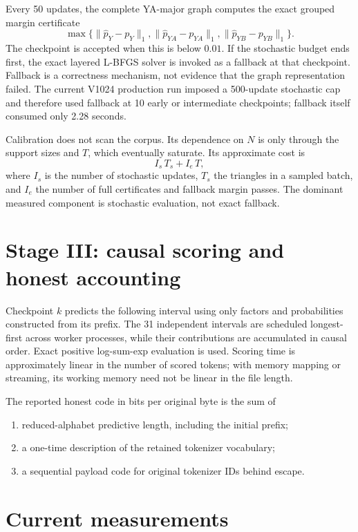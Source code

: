 \documentclass[11pt]{article}
\begin{document}
Every 50 updates, the complete YA-major graph computes the exact grouped
margin certificate
\[
 \max\{\|\widehat p_Y-p_Y\|_1,
        \|\widehat p_{YA}-p_{YA}\|_1,
        \|\widehat p_{YB}-p_{YB}\|_1\}.
\]
The checkpoint is accepted when this is below $0.01$.  If the stochastic
budget ends first, the exact layered L-BFGS solver is invoked as a fallback at
that checkpoint.  Fallback is a correctness mechanism, not evidence that the
graph representation failed.  The current V1024 production run imposed a
500-update stochastic cap and therefore used fallback at 10 early or
intermediate checkpoints; fallback itself consumed only 2.28 seconds.

Calibration does not scan the corpus.  Its dependence on $N$ is only through
the support sizes and $T$, which eventually saturate.  Its approximate cost is
\[
 I_s\,T_s + I_e\,T,
\]
where $I_s$ is the number of stochastic updates, $T_s$ the triangles in a
sampled batch, and $I_e$ the number of full certificates and fallback margin
passes.  The dominant measured component is stochastic evaluation, not exact
fallback.

\section{Stage III: causal scoring and honest accounting}

Checkpoint $k$ predicts the following interval using only factors and
probabilities constructed from its prefix.  The 31 independent intervals are
scheduled longest-first across worker processes, while their contributions
are accumulated in causal order.  Exact positive log-sum-exp evaluation is
used.  Scoring time is approximately linear in the number of scored tokens;
with memory mapping or streaming, its working memory need not be linear in
the file length.

The reported honest code in bits per original byte is the sum of
\begin{enumerate}
\item reduced-alphabet predictive length, including the initial prefix;
\item a one-time description of the retained tokenizer vocabulary;
\item a sequential payload code for original tokenizer IDs behind escape.
\end{enumerate}

\section{Current measurements}
\end{document}

